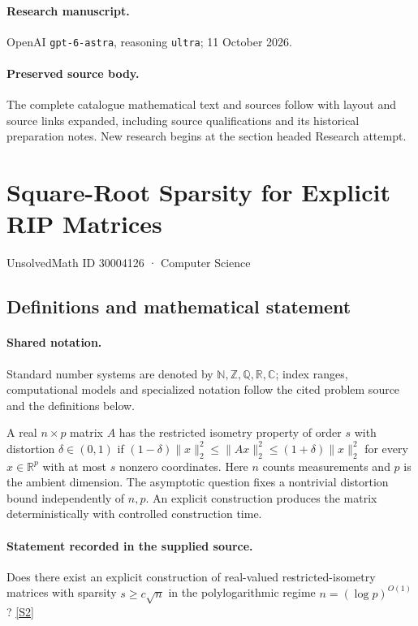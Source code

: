 \documentclass[11pt]{article}
\begin{document}
\paragraph{Research manuscript.} OpenAI \texttt{gpt-6-astra}, reasoning \texttt{ultra}; 11 October 2026.
\paragraph{Preserved source body.} The complete catalogue mathematical text and sources follow with layout and source links expanded, including source qualifications and its historical preparation notes. New research begins at the section headed Research attempt.

\section{Square-Root Sparsity for Explicit RIP Matrices}\label{30004126}
{\small UnsolvedMath ID 30004126 · Computer Science}
\subsection{Definitions and mathematical statement}

\paragraph{Shared notation.}Standard number systems are denoted by $\mathbb N,\mathbb Z,\mathbb Q,\mathbb R,\mathbb C$; index ranges, computational models and specialized notation follow the cited problem source and the definitions below.


A real $n\times p$ matrix $A$ has the restricted isometry property of order $s$ with distortion $\delta\in(0,1)$ if $(1-\delta)\|x\|_2^2\leq\|Ax\|_2^2\leq(1+\delta)\|x\|_2^2$ for every $x\in\mathbb R^p$ with at most $s$ nonzero coordinates. Here $n$ counts measurements and $p$ is the ambient dimension. The asymptotic question fixes a nontrivial distortion bound independently of $n,p$. An explicit construction produces the matrix deterministically with controlled construction time.
\paragraph{Statement recorded in the supplied source.}
Does there exist an explicit construction of real-valued restricted-isometry matrices with sparsity $s\geq c\sqrt n$ in the polylogarithmic regime $n=(\log p)^{O(1)}$? \href{https://doi.org/10.4171/owr/2019/19}{[S2]}
\end{document}
